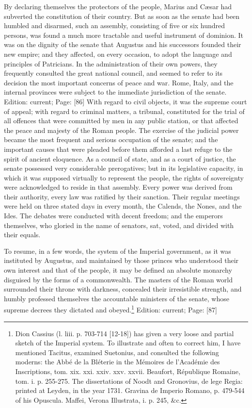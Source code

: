 By declaring themselves the protectors of the people, Marius and Cæsar had subverted the constitution of their country. But as soon as the senate had been humbled and disarmed, such an assembly, consisting of five or six hundred persons, was found a much more tractable and useful instrument of dominion. It was on the dignity of the senate that Augustus and his successors founded their new empire; and they affected, on every occasion, to adopt the language and principles of Patricians. In the administration of their own powers, they frequently consulted the great national council, and seemed to refer to its decision the most important concerns of peace and war. Rome, Italy, and the internal provinces were subject to the immediate jurisdiction of the senate. Edition: current; Page: [86] With regard to civil objects, it was the supreme court of appeal; with regard to criminal matters, a tribunal, constituted for the trial of all offences that were committed by men in any public station, or that affected the peace and majesty of the Roman people. The exercise of the judicial power became the most frequent and serious occupation of the senate; and the important causes that were pleaded before them afforded a last refuge to the spirit of ancient eloquence. As a council of state, and as a court of justice, the senate possessed very considerable prerogatives; but in its legislative capacity, in which it was supposed virtually to represent the people, the rights of sovereignty were acknowledged to reside in that assembly. Every power was derived from their authority, every law was ratified by their sanction. Their regular meetings were held on three stated days in every month, the Calends, the Nones, and the Ides. The debates were conducted with decent freedom; and the emperors themselves, who gloried in the name of senators, sat, voted, and divided with their equals.

To resume, in a few words, the system of the Imperial government, as it was instituted by Augustus, and maintained by those princes who understood their own interest and that of the people, it may be defined an absolute monarchy disguised by the forms of a commonwealth. The masters of the Roman world surrounded their throne with darkness, concealed their irresistible strength, and humbly professed themselves the accountable ministers of the senate, whose supreme decrees they dictated and obeyed.\footnote{Dion Cassius (l. liii. p. 703-714 [12-18]) has given a very loose and partial sketch of the Imperial system. To illustrate and often to correct him, I have mentioned Tacitus, examined Suetonius, and consulted the following moderns: the Abbé de la Bléterie in the Mémoires de l\texthebrew{}’Académie des Inscriptions, tom. xix. xxi. xxiv. xxv. xxvii. Beaufort, République Romaine, tom. i. p. 255-275. The dissertations of Noodt and Gronovius, de lege Regia: printed at Leyden, in the year 1731. Gravina de Imperio Romano, p. 479-544 of his Opuscula. Maffei, Verona Illustrata, i. p. 245, \&c.}
Edition: current; Page: [87]

